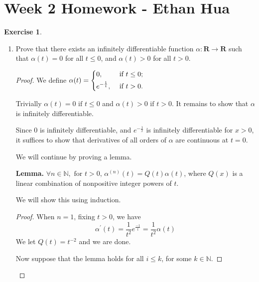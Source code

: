 \documentclass{article}
\newcommand{\R}{\mathbf{R}}
\theoremstyle{plain} %
\numberwithin{thm}{section} %
\theoremstyle{definition}
\newtheorem{exercise}[thm]{Exercise} %
\begin{document}
    \section{Week 2 Homework - Ethan Hua}
    \begin{exercise}
        \begin{enumerate}[label=(\alph*)]
            \item Prove that there exists an infinitely differentiable function $\alpha:\R\rightarrow \R$ such that $\alpha(t)=0$ for all $t\leq 0$, and $\alpha(t)>0$ for all $t>0$.
    
            \begin{proof}
                We define \(\alpha (t) =
                \begin{dcases}
                    0, &\text{ if } t \leq 0 ;\\
                    e^{-\frac{1}{t}} , &\text{ if } t > 0.\\
                \end{dcases}\) 
                
                Trivially \(\alpha (t) = 0 \text{ if } t \leq 0\) and \(\alpha (t) > 0 \text{ if }t > 0\). It remains to show that \(\alpha \) is infinitely differentiable.

                Since \(0\) is infinitely differentiable, and \(e^{-\frac{1}{x}}\) is infinitely differentiable for \(x > 0\), it suffices to show that derivatives of all orders of \(\alpha \) are continuous at \(t = 0\).

                We will continue by proving a lemma.

                \textbf{Lemma.} \(\forall n \in \mathbb{N}, \text{ for } t > 0 \text{, } \alpha^{(n)} (t) = Q(t)\alpha (t)\), where \(Q(x)\) is a linear combination of nonpositive integer powers of \(t\).

                We will show this using induction.
                \begin{proof}
                    When \(n=1\), fixing \(t > 0\), we have
                    \[
                        \alpha ^\prime(t) = \frac{1}{t^2}e^\frac{-1}{t} = \frac{1}{t^2}\alpha (t)
                    \]
                    We let \(Q(t) = t^{-2}\) and we are done.

                    Now suppose that the lemma holds for all \(i \leq k\), for some \(k \in \mathbb{N}\).


\end{proof}
\end{proof}
\end{enumerate}
\end{exercise}
\end{document}
